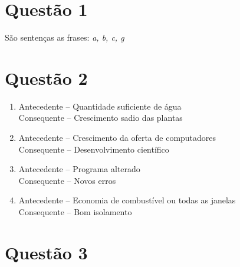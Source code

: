 

\maketitle
\pagebreak

\section*{Questão 1}

São sentenças as frases: \textit{a, b, c, g}

\section*{Questão 2}

\begin{enumerate}[wide, labelindent=0pt, label=\textbf{\alph*)}]
    \item   Antecedente – Quantidade suficiente de água\\
    \indent Consequente – Crescimento sadio das plantas
    \item   Antecedente – Crescimento da oferta de computadores\\
    \indent Consequente – Desenvolvimento científico
    \item   Antecedente – Programa alterado\\
    \indent Consequente – Novos erros
    \item   Antecedente – Economia de combustível ou todas as janelas\\
    \indent Consequente – Bom isolamento
\end{enumerate}

\section*{Questão 3}

\newcommand\fA{Rosas são vermelhas }
\newcommand\fa{rosas são vermelhas }
\newcommand\fnA{Rosas não são vermelhas }
\newcommand\fna{rosas não são vermelhas }
\newcommand\fB{Violetas são azuis }
\newcommand\fb{violetas são azuis }
\newcommand\fnB{Violetas não são azuis }
\newcommand\fnb{violetas não são azuis }
\newcommand\fC{Açúcar é doce }
\newcommand\fc{açúcar é doce }
\newcommand\fnC{Açúcar não é doce }
\newcommand\fnc{açúcar não é doce }

